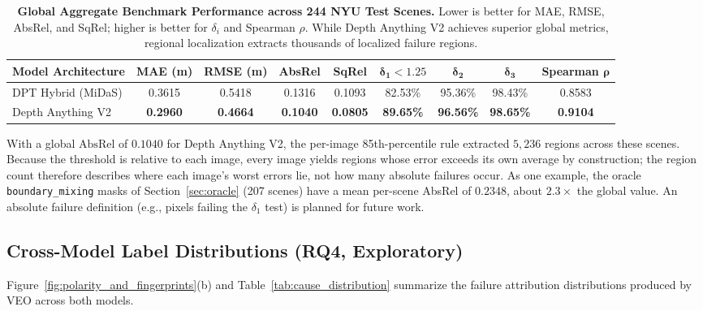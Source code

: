 \documentclass[11pt,a4paper]{article}
\begin{document}
\begin{table}[h]
\caption{\textbf{Global Aggregate Benchmark Performance across 244 NYU Test Scenes.} Lower is better for MAE, RMSE, AbsRel, and SqRel; higher is better for $\delta_i$ and Spearman $\rho$. While Depth Anything V2 achieves superior global metrics, regional localization extracts thousands of localized failure regions.}
\label{tab:global_benchmarks}
\centering
\small
\begin{tabular}{@{}lcccccccc@{}}
\toprule
\textbf{Model Architecture} & \textbf{MAE (m)} & \textbf{RMSE (m)} & \textbf{AbsRel} & \textbf{SqRel} & $\bm{\delta_1 < 1.25}$ & $\bm{\delta_2}$ & $\bm{\delta_3}$ & \textbf{Spearman} $\bm{\rho}$ \\
\midrule
DPT Hybrid (MiDaS) & 0.3615 & 0.5418 & 0.1316 & 0.1093 & 82.53\% & 95.36\% & 98.43\% & 0.8583 \\
Depth Anything V2 & \textbf{0.2960} & \textbf{0.4664} & \textbf{0.1040} & \textbf{0.0805} & \textbf{89.65\%} & \textbf{96.56\%} & \textbf{98.65\%} & \textbf{0.9104} \\
\bottomrule
\end{tabular}
\end{table}

With a global $\text{AbsRel}$ of $0.1040$ for Depth Anything V2, the per-image 85th-percentile rule extracted $5,236$ regions across these scenes. Because the threshold is relative to each image, every image yields regions whose error exceeds its own average by construction; the region count therefore describes where each image's worst errors lie, not how many absolute failures occur. As one example, the oracle \texttt{boundary\_mixing} masks of Section~\ref{sec:oracle} (207 scenes) have a mean per-scene AbsRel of $0.2348$, about $2.3\times$ the global value. An absolute failure definition (e.g., pixels failing the $\delta_1$ test) is planned for future work.

\subsection{Cross-Model Label Distributions (RQ4, Exploratory)}
Figure~\ref{fig:polarity_and_fingerprints}(b) and Table~\ref{tab:cause_distribution} summarize the failure attribution distributions produced by VEO across both models.
\end{document}
